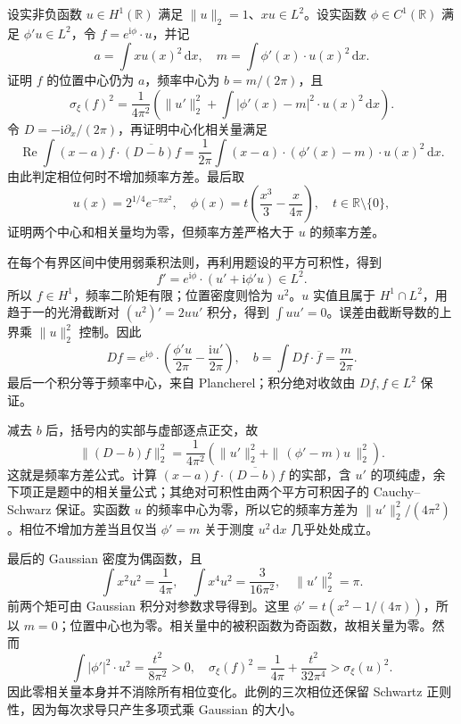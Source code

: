 \begin{optionalexercise}\label{b2:ex:20-new-1}
设实非负函数 \(u\in H^1(\mathbb R)\) 满足 \(\|u\|_2=1\)、\(xu\in L^2\)。设实函数 \(\phi\in C^1(\mathbb R)\) 满足 \(\phi'u\in L^2\)，令 \(f=e^{\mathrm i\phi}\cdot u\)，并记
\[
 a=\int x u(x)^2\,\mathrm dx,
 \quad m=\int\phi'(x)\cdot u(x)^2\,\mathrm dx.
\]
证明 \(f\) 的位置中心仍为 \(a\)，频率中心为 \(b=m/(2\pi)\)，且
\[
 \sigma_\xi(f)^2
 =\frac1{4\pi^2}\left(
       \|u'\|_2^2+\int|\phi'(x)-m|^2\cdot u(x)^2\,\mathrm dx\right).
\]
令 \(D=-\mathrm i\partial_x/(2\pi)\)，再证明中心化相关量满足
\[
 \operatorname{Re}\int (x-a)f\cdot\overline{(D-b)f}
 =\frac1{2\pi}\int (x-a)\cdot(\phi'(x)-m)\cdot u(x)^2\,\mathrm dx.
\]
由此判定相位何时不增加频率方差。最后取
\[
 u(x)=2^{1/4}e^{-\pi x^2},
 \quad \phi(x)=t\left(\frac{x^3}{3}-\frac{x}{4\pi}\right),
 \quad t\in\mathbb R\setminus\{0\},
\]
证明两个中心和相关量均为零，但频率方差严格大于 \(u\) 的频率方差。
\end{optionalexercise}
\begin{solution}
在每个有界区间中使用弱乘积法则，再利用题设的平方可积性，得到
\[
 f'=e^{\mathrm i\phi}\cdot(u'+\mathrm i\phi'u)\in L^2.
\]
所以 \(f\in H^1\)，频率二阶矩有限；位置密度则恰为 \(u^2\)。\(u\) 实值且属于 \(H^1\cap L^2\)，用趋于一的光滑截断对 \((u^2)'=2uu'\) 积分，得到 \(\int uu'=0\)。误差由截断导数的上界乘 \(\|u\|_2^2\) 控制。因此
\[
 Df=e^{\mathrm i\phi}\cdot
          \left(\frac{\phi'u}{2\pi}-\frac{\mathrm i u'}{2\pi}\right),
 \quad
 b=\int Df\cdot\overline f=\frac m{2\pi}.
\]
最后一个积分等于频率中心，来自 Plancherel；积分绝对收敛由 \(Df,f\in L^2\) 保证。

减去 \(b\) 后，括号内的实部与虚部逐点正交，故
\[
 \|(D-b)f\|_2^2
 =\frac1{4\pi^2}\left(
       \|u'\|_2^2+\|\, (\phi'-m)u\,\|_2^2\right).
\]
这就是频率方差公式。计算 \((x-a)f\cdot\overline{(D-b)f}\) 的实部，含 \(u'\) 的项纯虚，余下项正是题中的相关量公式；其绝对可积性由两个平方可积因子的 Cauchy--Schwarz 保证。实函数 \(u\) 的频率中心为零，所以它的频率方差为 \(\|u'\|_2^2/(4\pi^2)\)。相位不增加方差当且仅当 \(\phi'=m\) 关于测度 \(u^2\,\mathrm dx\) 几乎处处成立。

最后的 Gaussian 密度为偶函数，且
\[
 \int x^2u^2=\frac1{4\pi},
 \quad\int x^4u^2=\frac3{16\pi^2},
 \quad\|u'\|_2^2=\pi.
\]
前两个矩可由 Gaussian 积分对参数求导得到。这里
\(\phi'=t(x^2-1/(4\pi))\)，所以 \(m=0\)；位置中心也为零。相关量中的被积函数为奇函数，故相关量为零。然而
\[
 \int|\phi'|^2\cdot u^2=\frac{t^2}{8\pi^2}>0,
 \quad\sigma_\xi(f)^2
 =\frac1{4\pi}+\frac{t^2}{32\pi^4}
 >\sigma_\xi(u)^2.
\]
因此零相关量本身并不消除所有相位变化。此例的三次相位还保留 Schwartz 正则性，因为每次求导只产生多项式乘 Gaussian 的大小。
\end{solution}

